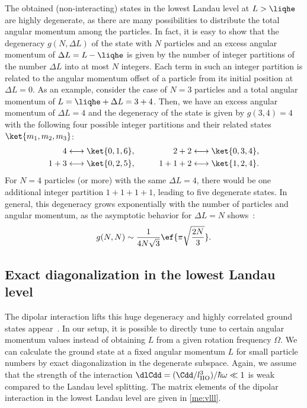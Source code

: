 The obtained (non-interacting) states in the lowest Landau level at $L>\liqhe$ are highly degenerate, as there are many possibilities to distribute the total angular momentum among the particles.
In fact, it is easy to show that the degeneracy $g(N, \Delta L)$ of the state with $N$ particles and an excess angular momentum of $\Delta L=L-\liqhe$ is given by the number
of integer partitions of the number $\Delta L$ into at most $N$ integers.
Each term in such an integer partition is related to the angular momentum offset of a particle from its initial position at $\Delta L = 0$.
As an example, consider the case of $N=3$ particles and a total angular momentum of $L=\liqhe + \Delta L = 3+4$. Then, we have an excess angular momentum of $\Delta L=4$ and the degeneracy of the state is given by $g(3,4)=4$ with the following four possible integer partitions and their related states $\ket{m_1,m_2,m_3}$:
\begin{align}
4 &\longleftrightarrow \ket{0,1,6}, &\qquad 2+2 \longleftrightarrow \ket{0,3,4},\\
1+3 &\longleftrightarrow \ket{0,2,5}, &\qquad 1+1+2 \longleftrightarrow \ket{1,2,4}.
\end{align}
For $N = 4$ particles (or more) with the same $\Delta L=4$, there would be one additional integer partition $1+1+1+1$, leading to five degenerate states.
In general, this degeneracy grows exponentially with the number of particles and angular momentum, as the asymptotic behavior for $\Delta L = N$ shows~\cite{Hardy1918}:
\begin{align}
g(N,N) \sim \frac{1}{4N\sqrt{3}} \ef{\pi \sqrt{\frac{2N}{3}}}.
\end{align}


\subsection{Exact diagonalization in the lowest Landau level}
The dipolar interaction lifts this huge degeneracy and highly correlated ground states appear~\cite{Cooper2005,Baranov2005,Osterloh2007,Qiu2011,Grass2011,Zhang2014}. In our setup, it is possible to directly tune to certain angular momentum values instead of obtaining $L$ from a given rotation frequency $\Omega$.
We can calculate the ground state at a fixed angular momentum $L$ for small particle numbers by exact diagonalization in the degenerate subspace.
Again, we assume that the strength of the interaction $\dlCdd=(\Cdd/l_\text{HO}^3)/\hbar\omega \ll 1$ is weak compared to the Landau level splitting.
The matrix elements of the dipolar interaction in the lowest Landau level are given in \cref{me:vlll}.

